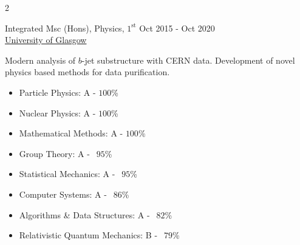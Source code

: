 \documentclass[10pt]{article}
\begin{document}
\begin{multicols*}{2}
\begin{description}[leftmargin=6pt]
        {\firamedium Integrated Msc (Hons), Physics, $1^{\text{st}}$} \hfill Oct 2015 - Oct 2020 \\
        \underline{University of Glasgow} \vspace{-7pt}
        \begin{justify} Modern analysis of $b$-jet substructure with CERN data. Development of novel physics based methods for data purification. \end{justify}
        \vspace{-14pt}
        \begin{itemize}
            \setlength{\itemsep}{-2pt}
            \item Particle Physics: \hfill A - $100$\%
            \item Nuclear Physics: \hfill A - $100$\%
            \item Mathematical Methods: \hfill A - $100$\%
            \item Group Theory: \hfill A - $\ \:95$\%
            \item Statistical Mechanics: \hfill A - $\ \:95$\%
            \item Computer Systems: \hfill A - $\ \:86$\%
            \item Algorithms \& Data Structures: \hfill A - $\ \:82$\%
            \item Relativistic Quantum Mechanics: \hfill B - $\ \:79$\%
        \end{itemize}


\end{description}
\end{multicols*}
\end{document}
